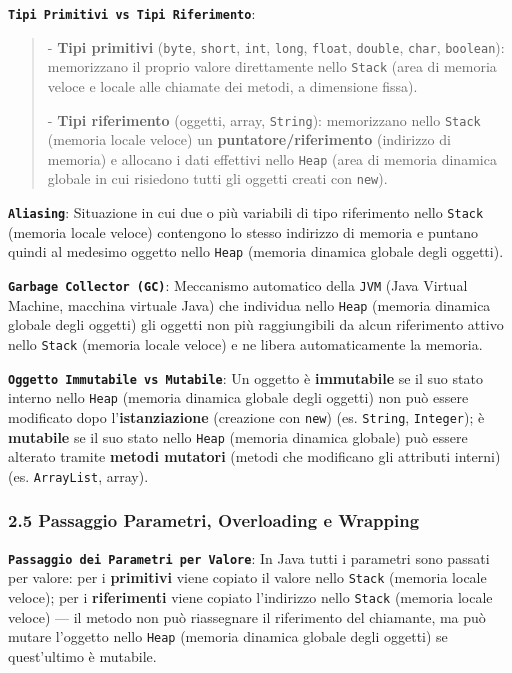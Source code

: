 \textbf{\texttt{Tipi Primitivi vs Tipi Riferimento}}:

\begin{quote}\small

- \textbf{Tipi primitivi} (\texttt{byte}, \texttt{short}, \texttt{int}, \texttt{long}, \texttt{float}, \texttt{double}, \texttt{char}, \texttt{boolean}): memorizzano il proprio valore direttamente nello \texttt{Stack} (area di memoria veloce e locale alle chiamate dei metodi, a dimensione fissa).

- \textbf{Tipi riferimento} (oggetti, array, \texttt{String}): memorizzano nello \texttt{Stack} (memoria locale veloce) un \textbf{puntatore/riferimento} (indirizzo di memoria) e allocano i dati effettivi nello \texttt{Heap} (area di memoria dinamica globale in cui risiedono tutti gli oggetti creati con \texttt{new}).

\end{quote}

\textbf{\texttt{Aliasing}}: Situazione in cui due o più variabili di tipo riferimento nello \texttt{Stack} (memoria locale veloce) contengono lo stesso indirizzo di memoria e puntano quindi al medesimo oggetto nello \texttt{Heap} (memoria dinamica globale degli oggetti).

\textbf{\texttt{Garbage Collector (GC)}}: Meccanismo automatico della \texttt{JVM} (Java Virtual Machine, macchina virtuale Java) che individua nello \texttt{Heap} (memoria dinamica globale degli oggetti) gli oggetti non più raggiungibili da alcun riferimento attivo nello \texttt{Stack} (memoria locale veloce) e ne libera automaticamente la memoria.

\textbf{\texttt{Oggetto Immutabile vs Mutabile}}: Un oggetto è \textbf{immutabile} se il suo stato interno nello \texttt{Heap} (memoria dinamica globale degli oggetti) non può essere modificato dopo l'\textbf{istanziazione} (creazione con \texttt{new}) (es. \texttt{String}, \texttt{Integer}); è \textbf{mutabile} se il suo stato nello \texttt{Heap} (memoria dinamica globale) può essere alterato tramite \textbf{metodi mutatori} (metodi che modificano gli attributi interni) (es. \texttt{ArrayList}, array).

\subsubsection{2.5 Passaggio Parametri, Overloading e Wrapping}\label{2-5-passaggio-parametri-overloading-e-wrapping}

\textbf{\texttt{Passaggio dei Parametri per Valore}}: In Java tutti i parametri sono passati per valore: per i \textbf{primitivi} viene copiato il valore nello \texttt{Stack} (memoria locale veloce); per i \textbf{riferimenti} viene copiato l'indirizzo nello \texttt{Stack} (memoria locale veloce) — il metodo non può riassegnare il riferimento del chiamante, ma può mutare l'oggetto nello \texttt{Heap} (memoria dinamica globale degli oggetti) se quest'ultimo è mutabile.

